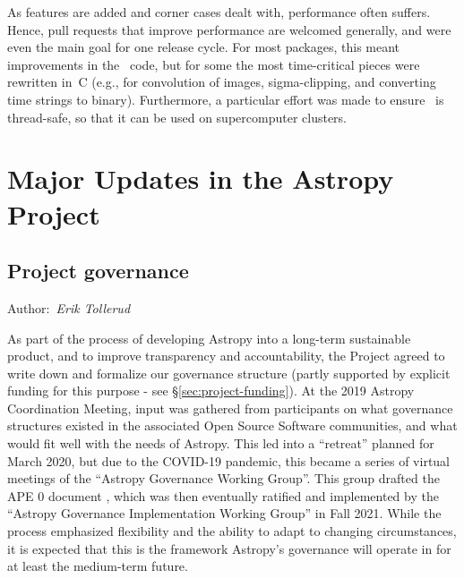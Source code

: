\documentclass[modern]{aastex631}
\newcommand{\secauthor}[1]{{\color{blue}Author:~\textit{#1}}}
\begin{document}
As features are added and corner cases dealt with, performance often
suffers.  Hence, pull requests that improve performance are welcomed
generally, and were even the main goal for one release cycle.  For
most packages, this meant improvements in the \python\ code, but for
some the most time-critical pieces were rewritten in~C (e.g., for
convolution of images, sigma-clipping, and converting time strings to
binary).  Furthermore, a particular effort was made to ensure
\astropypkg\ is thread-safe, so that it can be used on supercomputer
clusters.



\section{Major Updates in the Astropy Project} \label{sec:project-updates}

\subsection{Project governance} \label{sec:project-governance}

\secauthor{Erik Tollerud}


As part of the process of developing Astropy into a long-term sustainable
product, and to improve transparency and accountability, the Project agreed to
write down and formalize our governance structure (partly supported by explicit
funding for this purpose - see \S \ref{sec:project-funding}). At the 2019
Astropy Coordination Meeting, input was gathered from participants on what governance
structures existed in the associated Open Source Software communities, and what
would fit well with the needs of Astropy. This led into a ``retreat'' planned
for March 2020, but due to the COVID-19 pandemic, this became a series of
virtual meetings of the ``Astropy Governance Working Group''.  This group
drafted the APE 0 document \citep{ape0}, which was then eventually ratified and
implemented by the ``Astropy Governance Implementation Working Group'' in Fall
2021. While the process emphasized flexibility and the ability to adapt to
changing circumstances, it is expected that this is the framework Astropy's
governance will operate in for at least the medium-term future.
\end{document}
